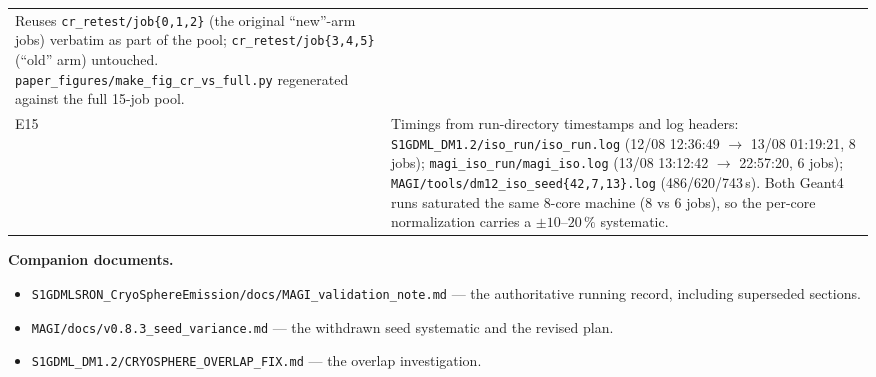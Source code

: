 \documentclass[11pt,a4paper]{article}
\begin{document}
\begin{longtable}{p{1.1cm}>{\raggedright\arraybackslash}p{14.5cm}}
     Reuses \texttt{cr\_retest/job\{0,1,2\}} (the original ``new''-arm jobs)
     verbatim as part of the pool; \texttt{cr\_retest/job\{3,4,5\}} (``old''
     arm) untouched. \texttt{paper\_figures/make\_fig\_cr\_vs\_full.py}
     regenerated against the full 15-job pool. \\
E15& Timings from run-directory timestamps and log headers:
     \texttt{S1GDML\_DM1.2/iso\_run/iso\_run.log} (12/08 12:36:49 $\to$
     13/08 01:19:21, 8 jobs); \texttt{magi\_iso\_run/magi\_iso.log}
     (13/08 13:12:42 $\to$ 22:57:20, 6 jobs);
     \texttt{MAGI/tools/dm12\_iso\_seed\{42,7,13\}.log} (486/620/743\,s).
     Both Geant4 runs saturated the same 8-core machine (8 vs 6 jobs), so the
     per-core normalization carries a $\pm10$--$20\,\%$ systematic. \\
\end{longtable}

\vspace{4mm}
\noindent\textbf{Companion documents.}
\begin{itemize}[nosep,leftmargin=*]
  \item \texttt{S1GDMLSRON\_CryoSphereEmission/docs/MAGI\_validation\_note.md}
        --- the authoritative running record, including superseded sections.
  \item \texttt{MAGI/docs/v0.8.3\_seed\_variance.md} --- the withdrawn seed
        systematic and the revised plan.
  \item \texttt{S1GDML\_DM1.2/CRYOSPHERE\_OVERLAP\_FIX.md} --- the overlap
        investigation.
\end{itemize}
\end{document}
